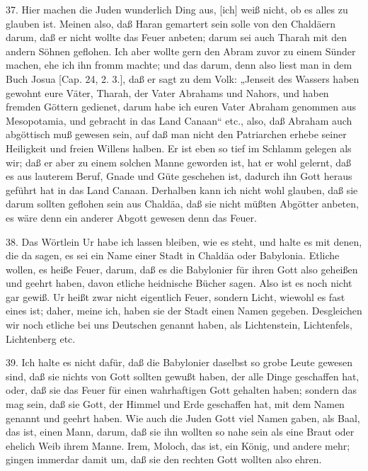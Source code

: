 37. Hier machen die Juden wunderlich Ding aus, [ich] weiß nicht, ob es alles zu glauben ist. Meinen also, daß Haran gemartert sein solle von den Chaldäern darum, daß er nicht wollte das Feuer anbeten; darum sei auch Tharah mit den andern Söhnen geflohen. Ich aber wollte gern den Abram zuvor zu einem Sünder machen, ehe ich ihn fromm machte; und das darum, denn also liest man in dem Buch Josua [Cap. 24, 2. 3.], daß er sagt zu dem Volk: „Jenseit des Wassers haben gewohnt eure Väter, Tharah, der Vater Abrahams und Nahors, und haben fremden Göttern gedienet, darum habe ich euren Vater Abraham genommen aus Mesopotamia, und gebracht in das Land Canaan“ etc., also, daß Abraham auch abgöttisch muß gewesen sein, auf daß man nicht den Patriarchen erhebe seiner Heiligkeit und freien Willens halben. Er ist eben so tief im Schlamm gelegen als wir; daß er aber zu einem solchen Manne geworden ist, hat er wohl gelernt, daß es aus lauterem Beruf, Gnade und Güte geschehen ist, dadurch ihn Gott heraus geführt hat in das Land Canaan. Derhalben kann ich nicht wohl glauben, daß sie darum sollten geflohen sein aus Chaldäa, daß sie nicht müßten Abgötter anbeten, es wäre denn ein anderer Abgott gewesen denn das Feuer.

38. Das Wörtlein Ur habe ich lassen bleiben, wie es steht, und halte es mit denen, die da sagen, es sei ein Name einer Stadt in Chaldäa oder Babylonia. Etliche wollen, es heiße Feuer, darum, daß es die Babylonier für ihren Gott also geheißen und geehrt haben, davon etliche heidnische Bücher sagen. Also ist es noch nicht gar gewiß. Ur heißt zwar nicht eigentlich Feuer, sondern Licht, wiewohl es fast eines ist; daher, meine ich, haben sie der Stadt einen Namen gegeben. Desgleichen wir noch etliche bei uns Deutschen genannt haben, als Lichtenstein, Lichtenfels, Lichtenberg etc.

39. Ich halte es nicht dafür, daß die Babylonier daselbst so grobe Leute gewesen sind, daß sie nichts von Gott sollten gewußt haben, der alle Dinge geschaffen hat, oder, daß sie das Feuer für einen wahrhaftigen Gott gehalten haben; sondern das mag sein, daß sie Gott, der Himmel und Erde geschaffen hat, mit dem Namen genannt und geehrt haben. Wie auch die Juden Gott viel Namen gaben, als Baal, das ist, einen Mann, darum, daß sie ihn wollten so nahe sein als eine Braut oder ehelich Weib ihrem Manne. Irem, Moloch, das ist, ein König, und andere mehr; gingen immerdar damit um, daß sie den rechten Gott wollten also ehren.

